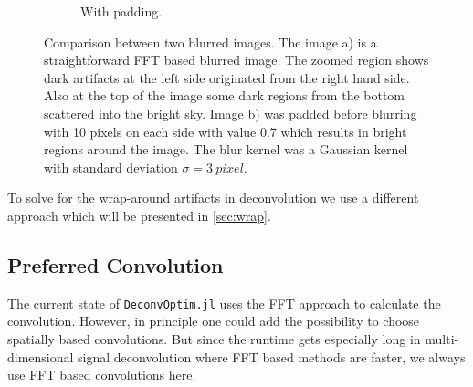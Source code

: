 \documentclass{juliacon}
\begin{document}
\begin{figure}[h]
\begin{subfigure}[b]{.25\textwidth}
            \caption{With padding.}
            \label{fig:withpad}
        \end{subfigure}
        \caption{Comparison between two blurred images. The image a) is a straightforward FFT based blurred image.
        The zoomed region shows dark artifacts at the left side originated from the right hand side. Also at the top of the image some dark regions from
        the bottom scattered into the bright sky.
        Image b) was padded before blurring with 10 pixels on each side with value 0.7 which results in bright regions around the image. The blur kernel was a Gaussian kernel
        with standard deviation $\sigma=\SI{3}{pixel}$.}
        \label{fig:}
    \end{figure}
    To solve for the wrap-around artifacts in deconvolution we use a different approach which will be presented in \autoref{sec:wrap}. 
\subsection{Preferred Convolution}
The current state of \verb|DeconvOptim.jl| uses the FFT approach to calculate the convolution.
However, in principle one could add the possibility to choose spatially based convolutions.
But since the runtime gets especially long in multi-dimensional signal deconvolution where FFT based methods
are faster, we always use FFT based convolutions here. 
   
\end{document}
